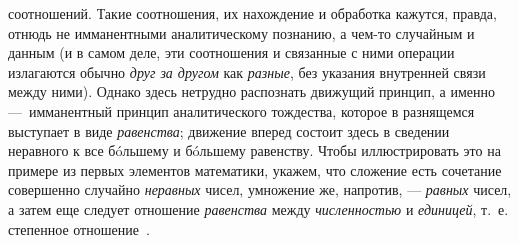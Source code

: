 \documentclass[twoside]{article}
\begin{document}
{соотношений. Такие соотношения, их нахождение и обработка кажутся, правда,
отнюдь не имманентными аналитическому познанию, а чем-то
случайным и данным (и в самом деле, эти соотношения и связанные с ними
операции излагаются обычно {\em друг за
другом} как
{\em разные}, без
указания внутренней связи между ними). Однако здесь нетрудно распознать
движущий принцип, а именно —~имманентный принцип
аналитического тождества, которое в разнящемся выступает в виде
{\em равенства}; движение
вперед состоит здесь в сведении неравного к все бóльшему и бóльшему
равенству. Чтобы иллюстрировать это на примере из первых элементов
математики, укажем, что сложение есть сочетание совершенно случайно
{\em неравных} чисел,
умножение же, напротив, — {\em равных}
чисел, а затем еще следует отношение
{\em равенства} между
{\em численностью} и
{\em единицей}, т.~е.
степенное
отношение~\label{bkm:bm101}.

}
\end{document}
